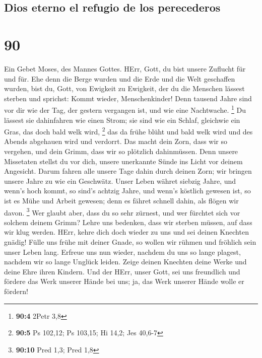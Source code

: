 \hypertarget{dios-eterno-el-refugio-de-los-perecederos}{%
\subsection{Dios eterno el refugio de los
perecederos}\label{dios-eterno-el-refugio-de-los-perecederos}}

\hypertarget{section-89}{%
\section{90}\label{section-89}}

 Ein Gebet Moses, des Mannes Gottes. HErr, Gott, du bist
unsere Zuflucht für und für.  Ehe denn die Berge wurden
und die Erde und die Welt geschaffen wurden, bist du, Gott, von Ewigkeit
zu Ewigkeit,  der du die Menschen lässest sterben und
sprichst: Kommt wieder, Menschenkinder!  Denn tausend
Jahre sind vor dir wie der Tag, der gestern vergangen ist, und wie eine
Nachtwache. \footnote{\textbf{90:4} 2Petr 3,8}  Du lässest
sie dahinfahren wie einen Strom; sie sind wie ein Schlaf, gleichwie ein
Gras, das doch bald welk wird, \footnote{\textbf{90:5} Ps 102,12; Ps
  103,15; Hi 14,2; Jes 40,6-7}  das da frühe blüht und
bald welk wird und des Abends abgehauen wird und verdorrt.
 Das macht dein Zorn, dass wir so vergehen, und dein
Grimm, dass wir so plötzlich dahinmüssen.  Denn unsere
Missetaten stellst du vor dich, unsere unerkannte Sünde ins Licht vor
deinem Angesicht.  Darum fahren alle unsere Tage dahin
durch deinen Zorn; wir bringen unsere Jahre zu wie ein Geschwätz.
 Unser Leben währet siebzig Jahre, und wenn's hoch kommt,
so sind's achtzig Jahre, und wenn's köstlich gewesen ist, so ist es Mühe
und Arbeit gewesen; denn es fähret schnell dahin, als flögen wir davon.
\footnote{\textbf{90:10} Pred 1,3; Pred 1,8}  Wer glaubt
aber, dass du so sehr zürnest, und wer fürchtet sich vor solchem deinem
Grimm?  Lehre uns bedenken, dass wir sterben müssen, auf
dass wir klug werden.  HErr, kehre dich doch wieder zu
uns und sei deinen Knechten gnädig!  Fülle uns frühe mit
deiner Gnade, so wollen wir rühmen und fröhlich sein unser Leben lang.
 Erfreue uns nun wieder, nachdem du uns so lange plagest,
nachdem wir so lange Unglück leiden.  Zeige deinen
Knechten deine Werke und deine Ehre ihren Kindern.  Und
der HErr, unser Gott, sei uns freundlich und fördere das Werk unserer
Hände bei uns; ja, das Werk unserer Hände wolle er fördern!

